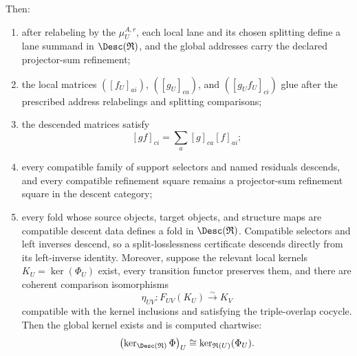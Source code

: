 \begin{theorem}
Then:
\begin{enumerate}[label=\textup{(D\arabic*)}]
\item after relabeling by the \(\mu_U^{A,r}\), each local lane and its chosen
splitting define a lane summand in \(\Desc(\mathfrak R)\), and the global
addresses carry the declared projector-sum refinement;
\item the local matrices \(([f_U]_{a i})\), \(([g_U]_{c a})\), and
\(([g_Uf_U]_{c i})\) glue after the prescribed address relabelings and
splitting comparisons;
\item the descended matrices satisfy
\[
 [gf]_{c i}=\sum_a[g]_{c a}[f]_{a i};
\]
\item every compatible family of support selectors and named residuals
descends, and every compatible refinement square remains a projector-sum
refinement square in the descent category;
\item every fold whose source objects, target objects, and structure maps are
compatible descent data defines a fold in \(\Desc(\mathfrak R)\).  Compatible
selectors and left inverses descend, so a split-losslessness certificate
descends directly from its left-inverse identity.  Moreover, suppose the
relevant local kernels \(K_U=\ker(\Phi_U)\) exist, every transition functor
preserves them, and there are coherent comparison isomorphisms
\[
 \eta_{UV}:F_{UV}(K_U)\xrightarrow{\sim}K_V
\]
compatible with the kernel inclusions and satisfying the triple-overlap
cocycle.  Then the global kernel exists and is computed chartwise:
\[
 \bigl(\ker_{\Desc(\mathfrak R)}\Phi\bigr)_U
 \cong
 \ker_{\mathfrak R(U)}(\Phi_U).
\]
\end{enumerate}
\end{theorem}

